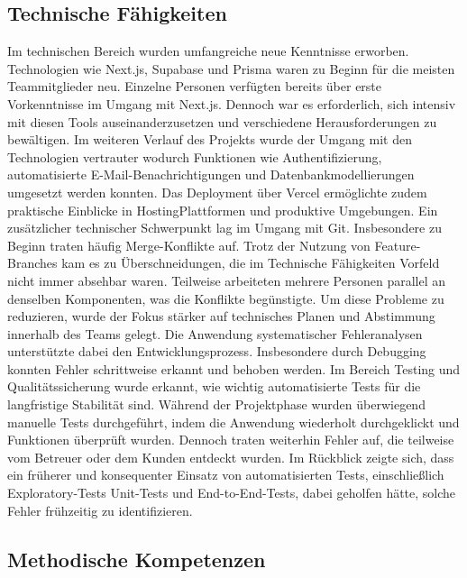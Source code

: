 \documentclass[a4paper,12pt]{article}
\begin{document}

\subsection{Technische Fähigkeiten}

Im technischen Bereich wurden umfangreiche neue Kenntnisse erworben. Technologien wie Next.js, Supabase und Prisma waren zu Beginn für die meisten Teammitglieder neu. Einzelne Personen verfügten bereits über erste Vorkenntnisse im Umgang mit Next.js. Dennoch war es erforderlich, sich intensiv mit diesen Tools auseinanderzusetzen und verschiedene Herausforderungen zu bewältigen. Im weiteren Verlauf des Projekts wurde der Umgang mit den Technologien vertrauter wodurch Funktionen wie Authentifizierung, automatisierte E-Mail-Benachrichtigungen und Datenbankmodellierungen umgesetzt werden konnten. Das Deployment über Vercel ermöglichte zudem praktische Einblicke in HostingPlattformen und produktive Umgebungen. Ein zusätzlicher technischer Schwerpunkt lag im Umgang mit Git. Insbesondere zu Beginn traten häufig Merge-Konflikte auf. Trotz der Nutzung von Feature-Branches kam es zu Überschneidungen, die im Technische Fähigkeiten Vorfeld nicht immer absehbar waren. Teilweise arbeiteten mehrere Personen parallel an denselben Komponenten, was die Konflikte begünstigte. Um diese Probleme zu reduzieren, wurde der Fokus stärker auf technisches Planen und Abstimmung innerhalb des Teams gelegt. Die Anwendung systematischer Fehleranalysen unterstützte dabei den Entwicklungsprozess. Insbesondere durch Debugging konnten Fehler schrittweise erkannt und behoben werden. Im Bereich Testing und Qualitätssicherung wurde erkannt, wie wichtig automatisierte Tests für die langfristige Stabilität sind. Während der Projektphase wurden überwiegend manuelle Tests durchgeführt, indem die Anwendung wiederholt durchgeklickt und Funktionen überprüft wurden. Dennoch traten weiterhin Fehler auf, die teilweise vom Betreuer oder dem Kunden entdeckt wurden. Im Rückblick zeigte sich, dass ein früherer und konsequenter Einsatz von automatisierten Tests, einschließlich Exploratory-Tests Unit-Tests und End-to-End-Tests, dabei geholfen hätte, solche Fehler frühzeitig zu identifizieren.


\subsection{Methodische Kompetenzen}
\end{document}
